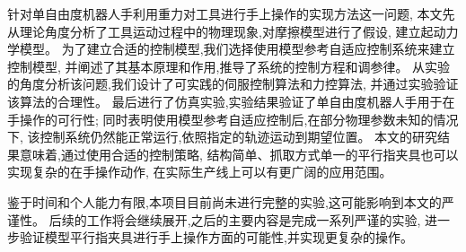 \begin{conclusion}
针对单自由度机器人手利用重力对工具进行手上操作的实现方法这一问题,
本文先从理论角度分析了工具运动过程中的物理现象,对摩擦模型进行了假设,
建立起动力学模型。
为了建立合适的控制模型,我们选择使用模型参考自适应控制系统来建立控制模型,
并阐述了其基本原理和作用,推导了系统的控制方程和调参律。
从实验的角度分析该问题,我们设计了可实践的伺服控制算法和力控算法,
并通过实验验证该算法的合理性。
最后进行了仿真实验,实验结果验证了单自由度机器人手用于在手操作的可行性;
同时表明使用模型参考自适应控制后,在部分物理参数未知的情况下,
该控制系统仍然能正常运行,依照指定的轨迹运动到期望位置。
本文的研究结果意味着,通过使用合适的控制策略,
结构简单、抓取方式单一的平行指夹具也可以实现复杂的在手操作动作,
在实际生产线上可以有更广阔的应用范围。

鉴于时间和个人能力有限,本项目目前尚未进行完整的实验,这可能影响到本文的严谨性。
后续的工作将会继续展开,之后的主要内容是完成一系列严谨的实验,
进一步验证模型平行指夹具进行手上操作方面的可能性,并实现更复杂的操作。
    
\end{conclusion}


